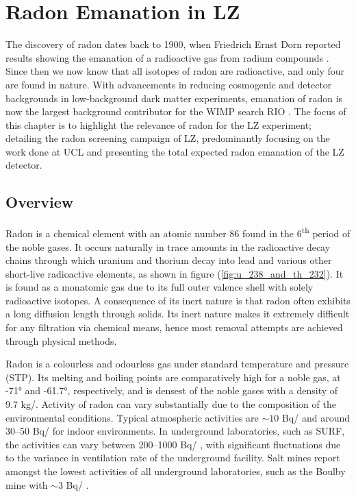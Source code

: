 \chapter{Radon Emanation in LZ}
\label{chap:chap4}

The discovery of radon dates back to 1900, when Friedrich Ernst Dorn reported results showing the emanation of a radioactive gas from radium compounds \cite{PARTINGTON1957}. Since then we now know that all isotopes of radon are radioactive, and only four are found in nature. With advancements in reducing cosmogenic and detector backgrounds in low-background dark matter experiments, emanation of radon is now the largest background contributor for the WIMP search RIO \cite{akerib2018projected}. The focus of this chapter is to highlight the relevance of radon for the LZ experiment; detailing the radon screening campaign of LZ, predominantly focusing on the work done at UCL and presenting the total expected radon emanation of the LZ detector.


\section{Overview}

Radon is a chemical element with an atomic number 86 found in the 6\textsuperscript{th} period of the noble gases. It occurs naturally in trace amounts in the radioactive decay chains through which uranium and thorium decay into lead and various other short-live radioactive elements, as shown in figure (\ref{fig:u_238_and_th_232}). It is found as a monatomic gas due to its full outer valence shell with solely radioactive isotopes. A consequence of its inert nature is that radon often exhibits a long diffusion length through solids. Its inert nature makes it extremely difficult for any filtration via chemical means, hence most removal attempts are achieved through physical methods. 

Radon is a colourless and odourless gas under standard temperature and pressure (STP). Its melting and boiling points are comparatively high for a noble gas, at -71\si{\degree} and -61.7\si{\degree}, respectively, and is densest of the noble gases with a density of 9.7 kg/\cubicmeter{}. Activity of radon can vary substantially due to the composition of the environmental conditions. Typical atmospheric activities are $\sim10$ Bq/\cubicmeter{} and around 30--50 Bq/\cubicmeter{} for indoor environments. In underground laboratories, such as SURF, the activities can vary between 200--1000 Bq/\cubicmeter{} \cite{Heise_2015}, with significant fluctuations due to the variance in ventilation rate of the underground facility. Salt mines report amongst the lowest activities of all underground laboratories, such as the Boulby mine with $\sim3$ Bq/\cubicmeter{} \cite{scovell_boulby}. 

